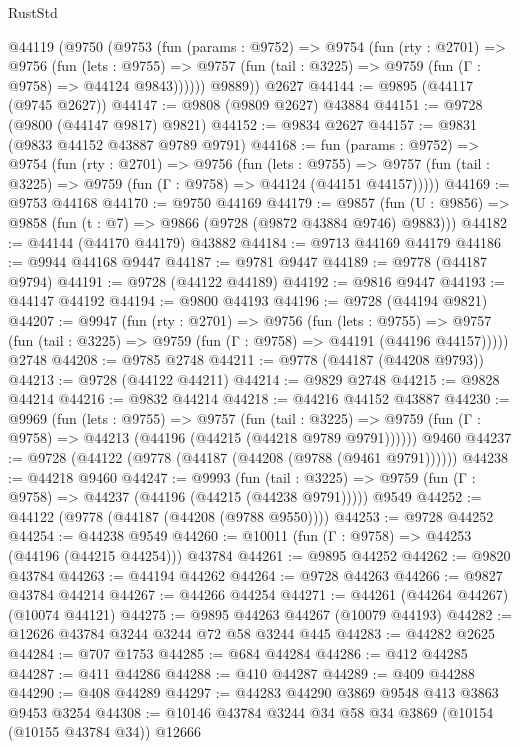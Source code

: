 \begin{lexlean}{RustStd}
\begin{coremodule}
    @44119
      (@9750
        (@9753
          (fun (params : @9752) =>
          @9754
            (fun (rty : @2701) =>
            @9756
              (fun (lets : @9755) =>
              @9757 (fun (tail : @3225) => @9759 (fun (Γ : @9758) => @44124 @9843))))))
        @9889))
    @2627
@44144 := @9895 (@44117 (@9745 @2627))
@44147 := @9808 (@9809 @2627) @43884
@44151 := @9728 (@9800 (@44147 @9817) @9821)
@44152 := @9834 @2627
@44157 := @9831 (@9833 @44152 @43887 @9789 @9791)
@44168 := fun (params : @9752) =>
  @9754
    (fun (rty : @2701) =>
    @9756
      (fun (lets : @9755) =>
      @9757 (fun (tail : @3225) => @9759 (fun (Γ : @9758) => @44124 (@44151 @44157)))))
@44169 := @9753 @44168
@44170 := @9750 @44169
@44179 := @9857
    (fun (U : @9856) => @9858 (fun (t : @7) => @9866 (@9728 (@9872 @43884 @9746) @9883)))
@44182 := @44144 (@44170 @44179) @43882
@44184 := @9713 @44169 @44179
@44186 := @9944 @44168 @9447
@44187 := @9781 @9447
@44189 := @9778 (@44187 @9794)
@44191 := @9728 (@44122 @44189)
@44192 := @9816 @9447
@44193 := @44147 @44192
@44194 := @9800 @44193
@44196 := @9728 (@44194 @9821)
@44207 := @9947
    (fun (rty : @2701) =>
    @9756
      (fun (lets : @9755) =>
      @9757 (fun (tail : @3225) => @9759 (fun (Γ : @9758) => @44191 (@44196 @44157)))))
    @2748
@44208 := @9785 @2748
@44211 := @9778 (@44187 (@44208 @9793))
@44213 := @9728 (@44122 @44211)
@44214 := @9829 @2748
@44215 := @9828 @44214
@44216 := @9832 @44214
@44218 := @44216 @44152 @43887
@44230 := @9969
    (fun (lets : @9755) =>
    @9757
      (fun (tail : @3225) =>
      @9759 (fun (Γ : @9758) => @44213 (@44196 (@44215 (@44218 @9789 @9791))))))
    @9460
@44237 := @9728 (@44122 (@9778 (@44187 (@44208 (@9788 (@9461 @9791))))))
@44238 := @44218 @9460
@44247 := @9993
    (fun (tail : @3225) => @9759 (fun (Γ : @9758) => @44237 (@44196 (@44215 (@44238 @9791)))))
    @9549
@44252 := @44122 (@9778 (@44187 (@44208 (@9788 @9550))))
@44253 := @9728 @44252
@44254 := @44238 @9549
@44260 := @10011 (fun (Γ : @9758) => @44253 (@44196 (@44215 @44254))) @43784
@44261 := @9895 @44252
@44262 := @9820 @43784
@44263 := @44194 @44262
@44264 := @9728 @44263
@44266 := @9827 @43784 @44214
@44267 := @44266 @44254
@44271 := @44261 (@44264 @44267) (@10074 @44121)
@44275 := @9895 @44263 @44267 (@10079 @44193)
@44282 := @12626 @43784 @3244 @3244 @72 @58 @3244 @445
@44283 := @44282 @2625
@44284 := @707 @1753
@44285 := @684 @44284
@44286 := @412 @44285
@44287 := @411 @44286
@44288 := @410 @44287
@44289 := @409 @44288
@44290 := @408 @44289
@44297 := @44283 @44290 @3869 @9548 @413 @3863 @9453 @3254
@44308 := @10146 @43784 @3244 @34 @58 @34 @3869 (@10154 (@10155 @43784 @34)) @12666

\end{coremodule}
\end{lexlean}
